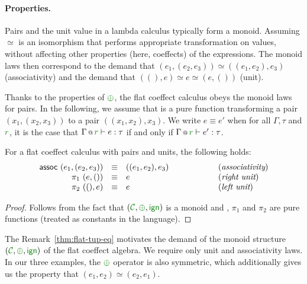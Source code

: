 \paragraph{Properties.}
Pairs and the unit value in a lambda calculus typically form a monoid. Assuming $\simeq$ is an
isomorphism that performs appropriate transformation on values, without affecting other
properties (here, coeffects) of the expressions. The monoid laws then correspond to
the demand that $(e_1, (e_2, e_3)) \simeq ((e_1, e_2), e_3)$ (associativity) and the
demand that $((), e) \simeq e \simeq (e, ())$ (unit).

Thanks to the properties of $\cpar$, the flat coeffect calculus obeys the monoid laws for pairs.
In the following, we assume that  is a pure function transforming a pair $(x_1, (x_2, x_3))$
to a pair $((x_1, x_2), x_3)$. We write $e \equiv e'$ when for all $\Gamma, \tau$ and $\cclrd{r}$,
it is the case that $\coctx{\Gamma}{\cclrd{r}} \vdash e : \tau$ if and only if
$\coctx{\Gamma}{\cclrd{r}} \vdash e' : \tau$.

\begin{remark}
\label{thm:flat-tup-eq}
For a flat coeffect calculus with pairs and units, the following holds:
%
\begin{equation*}
\begin{array}{rclcl}
 \textnormal{\sffamily assoc}~(e_1, (e_2, e_3)) &\equiv& ((e_1, e_2), e_3) &\qquad\qquad&(\emph{associativity}) \\
 \pi_1~(e, ()) &\equiv& e &&(\emph{right unit})\\
 \pi_2~((), e) &\equiv& e &&(\emph{left unit})\\
\end{array}
\end{equation*}
\end{remark}
\begin{proof}
Follows from the fact that $(\C, \cpar, \czero)$ is a monoid and , $\pi_1$ and
$\pi_2$ are pure functions (treated as constants in the language).
\end{proof}

\noindent
The Remark~\ref{thm:flat-tup-eq} motivates the demand of the monoid structure
$(\C, \cpar, \czero)$ of the flat coeffect algebra. We require only unit and associativity
laws. In our three examples, the $\cpar$ operator is also symmetric, which additionally
gives us the property that $(e_1, e_2) \simeq (e_2, e_1)$.



%
%
